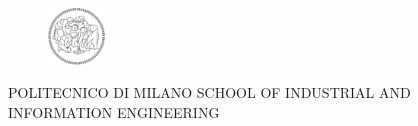 \documentclass[]{standalone}
\begin{document}
\begin{figure}
  \begin{center}
    \includegraphics[height=1.5cm]{pictures/newlogo}
  \end{center}
\end{figure}
  {
\Large POLITECNICO DI MILANO \vspace{0.2cm} \small {\large S}CHOOL OF {\large I}NDUSTRIAL AND {\large I}NFORMATION {\large E}NGINEERING
}
\end{document}
